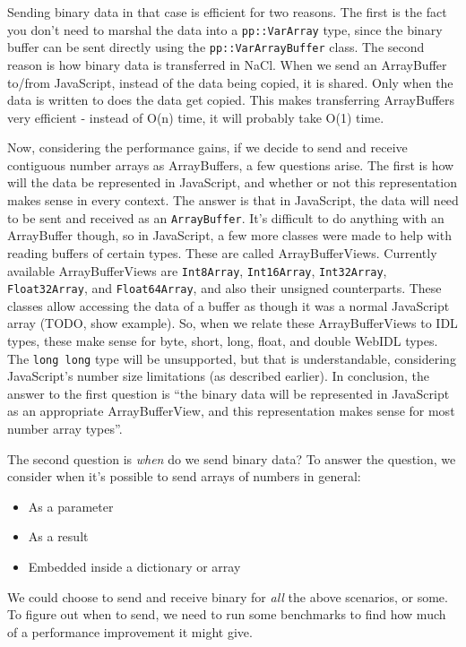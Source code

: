 Sending binary data in that case is efficient for two reasons. The first is the fact you don't need to marshal the data into a \lstinline{pp::VarArray} type, since the binary buffer can be sent directly using the \lstinline{pp::VarArrayBuffer} class. The second reason is how binary data is transferred in NaCl. When we send an ArrayBuffer to/from JavaScript, instead of the data being copied, it is shared. Only when the data is written to does the data get copied. This makes transferring ArrayBuffers very efficient - instead of O(n) time, it will probably take O(1) time.

Now, considering the performance gains, if we decide to send and receive contiguous number arrays as ArrayBuffers, a few questions arise. The first is how will the data be represented in JavaScript, and whether or not this representation makes sense in every context. The answer is that in JavaScript, the data will need to be sent and received as an \lstinline{ArrayBuffer}. It's difficult to do anything with an ArrayBuffer though, so in JavaScript, a few more classes were made to help with reading buffers of certain types. These are called ArrayBufferViews. Currently available ArrayBufferViews are \lstinline{Int8Array}, \lstinline{Int16Array}, \lstinline{Int32Array}, \lstinline{Float32Array}, and \lstinline{Float64Array}, and also their unsigned counterparts. These classes allow accessing the data of a buffer as though it was a normal JavaScript array (TODO, show example). So, when we relate these ArrayBufferViews to IDL types, these make sense for byte, short, long, float, and double WebIDL types. The \lstinline{long long} type will be unsupported, but that is understandable, considering JavaScript's number size limitations (as described earlier). In conclusion, the answer to the first question is ``the binary data will be represented in JavaScript as an appropriate ArrayBufferView, and this representation makes sense for most number array types''.

The second question is \emph{when} do we send binary data? To answer the question, we consider when it's possible to send arrays of numbers in general:

\begin{itemize}
	\item As a parameter
	\item As a result
	\item Embedded inside a dictionary or array
\end{itemize}

We could choose to send and receive binary for \emph{all} the above scenarios, or some. To figure out when to send, we need to run some benchmarks to find how much of a performance improvement it might give.

